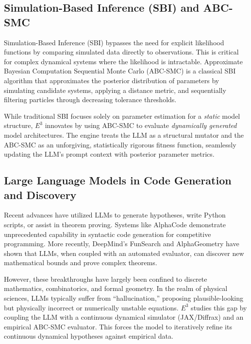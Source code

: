 \subsection{Simulation-Based Inference (SBI) and ABC-SMC}
Simulation-Based Inference (SBI) bypasses the need for explicit likelihood functions by comparing simulated data directly to observations. This is critical for complex dynamical systems where the likelihood is intractable. Approximate Bayesian Computation Sequential Monte Carlo (ABC-SMC) is a classical SBI algorithm that approximates the posterior distribution of parameters by simulating candidate systems, applying a distance metric, and sequentially filtering particles through decreasing tolerance thresholds.

While traditional SBI focuses solely on parameter estimation for a \textit{static} model structure, $E^3$ innovates by using ABC-SMC to evaluate \textit{dynamically generated} model architectures. The engine treats the LLM as a structural mutator and the ABC-SMC as an unforgiving, statistically rigorous fitness function, seamlessly updating the LLM's prompt context with posterior parameter metrics.

\subsection{Large Language Models in Code Generation and Discovery}
Recent advances have utilized LLMs to generate hypotheses, write Python scripts, or assist in theorem proving. Systems like AlphaCode demonstrate unprecedented capability in syntactic code generation for competitive programming. More recently, DeepMind's FunSearch \citep{romera2023mathematical} and AlphaGeometry \citep{trinh2024solving} have shown that LLMs, when coupled with an automated evaluator, can discover new mathematical bounds and prove complex theorems. 

However, these breakthroughs have largely been confined to discrete mathematics, combinatorics, and formal geometry. In the realm of physical sciences, LLMs typically suffer from ``hallucination,'' proposing plausible-looking but physically incorrect or numerically unstable equations. $E^3$ studies this gap by coupling the LLM with a continuous dynamical simulator (JAX/Diffrax) and an empirical ABC-SMC evaluator. This forces the model to iteratively refine its continuous dynamical hypotheses against empirical data.
